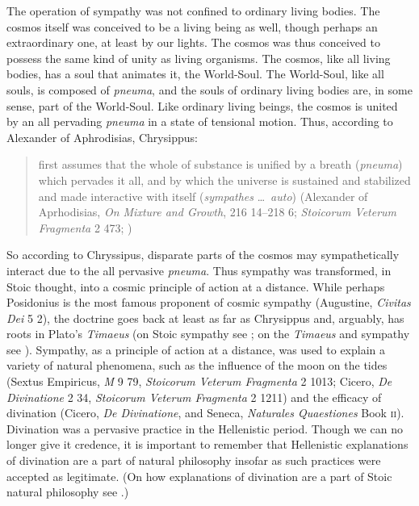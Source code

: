 The operation of sympathy was not confined to ordinary living bodies. The cosmos itself was conceived to be a living being as well, though perhaps an extraordinary one, at least by our lights. The cosmos was thus conceived to possess the same kind of unity as living organisms. The cosmos, like all living bodies, has a soul that animates it, the World-Soul. The World-Soul, like all souls, is composed of \emph{pneuma}, and the souls of ordinary living bodies are, in some sense, part of the World-Soul. Like ordinary living beings, the cosmos is united by an all pervading \emph{pneuma} in a state of tensional motion. Thus, according to Alexander of Aphrodisias, Chrysippus: 
\begin{quote}
	first assumes that the whole of substance is unified by a breath (\emph{pneuma}) which pervades it all, and by which the universe is sustained and stabilized and made interactive with itself (\emph{sympathes} \ldots\ \emph{auto}) (Alexander of Aprhodisias, \emph{On Mixture and Growth}, 216 14--218 6; \emph{Stoicorum Veterum Fragmenta} 2 473; \citealt[48 C]{Long:1987aa})
\end{quote}
So according to Chryssipus, disparate parts of the cosmos may sympathetically interact due to the all pervasive \emph{pneuma}.  Thus sympathy was transformed, in Stoic thought, into a cosmic principle of action at a distance. While perhaps Posidonius is the most famous proponent of cosmic sympathy (Augustine, \emph{Civitas Dei} 5 2), the doctrine goes back at least as far as Chrysippus and, arguably, has roots in Plato's \emph{Timaeus} (on Stoic sympathy see \citealt{Sambursky:1959ms,Meyer:2009xp,Brouwer:2015ee}; on the \emph{Timaeus} and sympathy see \citealt{Emilsson:2015wf}). Sympathy, as a principle of action at a distance, was used to explain a variety of natural phenomena, such as the influence of the moon on the tides (Sextus Empiricus, \emph{M} 9 79, \emph{Stoicorum Veterum Fragmenta} 2 1013; Cicero, \emph{De Divinatione} 2 34, \emph{Stoicorum Veterum Fragmenta} 2 1211) and the efficacy of divination (Cicero, \emph{De Divinatione}, and Seneca, \emph{Naturales Quaestiones} Book \textsc{ii}). Divination was a pervasive practice in the Hellenistic period. Though we can no longer give it credence, it is important to remember that Hellenistic explanations of divination are a part of natural philosophy insofar as such practices were accepted as legitimate. (On how explanations of divination are a part of Stoic natural philosophy see \citealt{Struck:2007aa}.)


